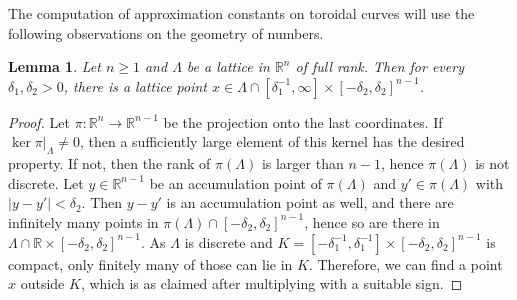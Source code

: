 \documentclass[a4paper, twoside, 11pt]{amsart}
\newtheorem{lemma}[theorem]{Lemma}
\theoremstyle{definition}
\newcommand{\RR}{\mathbb{R}}
\begin{document}
The computation of approximation constants on toroidal curves will use the following observations on the geometry of numbers.
\begin{lemma}\label{lem:geom-numbers}
	Let $n\ge 1$ and $\Lambda$ be a lattice in $\RR^n$ of full rank. Then for every $\delta_1,\delta_2>0$, there is a lattice point $x\in \Lambda \cap [\delta_1^{-1},\infty]\times [-\delta_2,\delta_2]^{n-1}$.
\end{lemma}
\begin{proof}
Let $\pi\colon \RR^n\to \RR^{n-1}$ be the projection onto the last coordinates. If $\ker \pi|_\Lambda \ne 0$, then a sufficiently large element of this kernel has the desired property. If not, then the rank of $\pi(\Lambda)$ is larger than $n-1$, hence $\pi(\Lambda)$ is not discrete. Let $y\in \RR^{n-1}$ be an accumulation point of $\pi(\Lambda)$ and $y'\in \pi(\Lambda)$ with $|y-y'|<\delta_2$. Then $y-y'$ is an accumulation point as well, and there are infinitely many points in $\pi(\Lambda)\cap [-\delta_2,\delta_2]^{n-1}$, hence so are there in $\Lambda \cap \RR \times [-\delta_2,\delta_2]^{n-1}$. As $\Lambda$ is discrete and $K=[-\delta_1^{-1},\delta_1^{-1}]\times [-\delta_2,\delta_2]^{n-1}$ is compact, only finitely many of those can lie in $K$. Therefore, we can find a point $x$ outside $K$, which is as claimed after multiplying with a suitable sign.
\end{proof}
\end{document}
